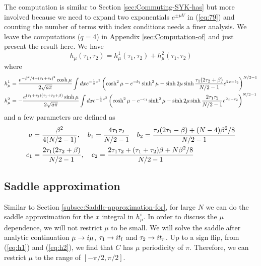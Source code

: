 \documentclass[11pt]{article}
\renewcommand{\>}{\rangle}
\newcommand{\<}{\langle}
\begin{document}
The computation is similar to Section \ref{sec:Commuting-SYK-has}
but more involved because we need to expand two exponentials $e^{\pm\mu V}$
in (\ref{eq:79}) and counting the number of terms with index conditions
needs a finer analysis. We leave the computations ($q=4$) in Appendix
\ref{sec:Computation-of} and just present the result here. We have 
\begin{equation}
h_{\mu}(\tau_{1},\tau_{2})=h_{\mu}^{1}(\tau_{1},\tau_{2})+h_{\mu}^{2}(\tau_{1},\tau_{2})
\end{equation}
where 
\begin{align}
h_{\mu}^{1} & =\frac{e^{-\beta^{2}/4+(\tau_{1}+\tau_{2})^{2}}\cosh\mu}{2\sqrt{a\pi}}\int dxe^{-\frac{1}{a}x^{2}}\left(\cosh^{2}\mu-e^{-b_{1}}\sinh^{2}\mu-\sinh2\mu\sinh\frac{\tau_{1}(2\tau_{2}+\beta)}{N/2-1}e^{2x-b_{2}}\right)^{N/2-1}\label{eq:h1}\\
h_{\mu}^{2} & =-\frac{e^{(\tau_{1}+\tau_{2})(\tau_{1}+\tau_{2}+\beta)}\sinh\mu}{2\sqrt{a\pi}}\int dxe^{-\frac{1}{a}x^{2}}\left(\cosh^{2}\mu-e^{-c_{1}}\sinh^{2}\mu-\sinh2\mu\sinh\frac{2\tau_{1}\tau_{2}}{N/2-1}e^{2x-c_{2}}\right)^{N/2-1}\label{eq:h2}
\end{align}
and a few parameters are defined as 
\begin{align}
a & =\frac{\beta^{2}}{4(N/2-1)},\quad b_{1}=\frac{4\tau_{1}\tau_{2}}{N/2-1}\quad b_{2}=\frac{\tau_{2}(2\tau_{1}-\beta)+(N-4)\beta^{2}/8}{N/2-1}\\
c_{1} & =\frac{2\tau_{1}(2\tau_{2}+\beta)}{N/2-1},\quad c_{2}=\frac{2\tau_{1}\tau_{2}+(\tau_{1}+\tau_{2})\beta+N\beta^{2}/8}{N/2-1}
\end{align}


\subsection{Saddle approximation}

Similar to Section \ref{subsec:Saddle-approximation-for}, for large
$N$ we can do the saddle approximation for the $x$ integral in $h_{\mu}^{i}$.
In order to discuss the $\mu$ dependence, we will not restrict $\mu$
to be small. We will solve the saddle after analytic continuation
$\mu\rightarrow i\mu$, $\tau_{1}\rightarrow it_{l}$ and $\tau_{2}\rightarrow it_{r}$. Up
to a sign flip, from (\ref{eq:h1}) and (\ref{eq:h2}), we find that
$C$ has $\mu$ periodicity of $\pi$. Therefore, we can restrict
$\mu$ to the range of $[-\pi/2,\pi/2]$. 
\end{document}
